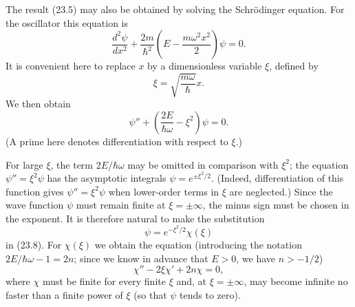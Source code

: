 The result (23.5) may also be obtained by solving the Schrödinger equation.
For the oscillator this equation is
\begin{equation}
  \frac{d^2\psi}{dx^2}+\frac{2m}{\hbar^2}
  \left(E-\frac{m\omega^2x^2}{2}\right)\psi=0.
  \tag{23.6}
\end{equation}
It is convenient here to replace $x$ by a dimensionless variable $\xi$,
defined by
\begin{equation}
  \xi=\sqrt{\frac{m\omega}{\hbar}}x.
  \tag{23.7}
\end{equation}
We then obtain
\begin{equation}
  \psi''+\left(\frac{2E}{\hbar\omega}-\xi^2\right)\psi=0.
  \tag{23.8}
\end{equation}
(A prime here denotes differentiation with respect to $\xi$.)

For large $\xi$, the term $2E/\hbar\omega$ may be omitted in comparison with
$\xi^2$; the equation $\psi''=\xi^2\psi$ has the asymptotic integrals
$\psi=e^{\pm\xi^2/2}$. (Indeed, differentiation of this function gives
$\psi''=\xi^2\psi$ when lower-order terms in $\xi$ are neglected.) Since the
wave function $\psi$ must remain finite at $\xi=\pm\infty$, the minus sign
must be chosen in the exponent. It is therefore natural to make the
substitution
\begin{equation}
  \psi=e^{-\xi^2/2}\chi(\xi)
  \tag{23.9}
\end{equation}
in (23.8). For $\chi(\xi)$ we obtain the equation (introducing the notation
$2E/\hbar\omega-1=2n$; since we know in advance that $E>0$, we have
$n>-1/2$)
\begin{equation}
  \chi''-2\xi\chi'+2n\chi=0,
  \tag{23.10}
\end{equation}
where $\chi$ must be finite for every finite $\xi$ and, at
$\xi=\pm\infty$, may become infinite no faster than a finite power of $\xi$
(so that $\psi$ tends to zero).

